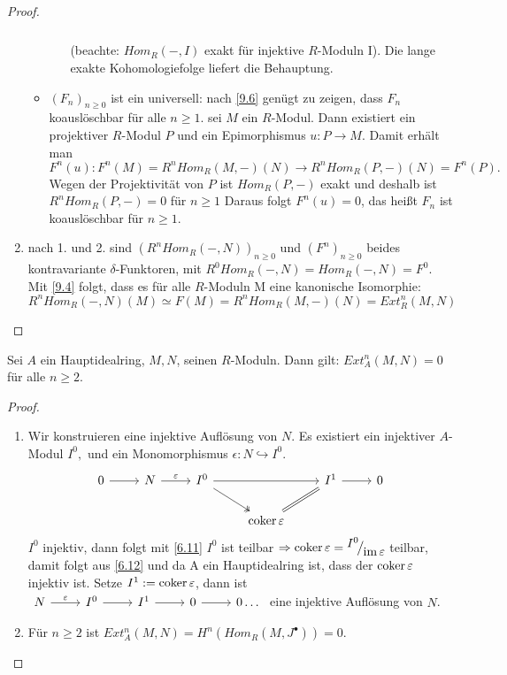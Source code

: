 \begin{proof}
\begin{enumerate}
\begin{itemize}
\begin{itemize}
$$\begin{tikzcd}
				\end{tikzcd}$$ (beachte: $Hom_R(-,I)$ exakt für injektive $R$-Moduln I). Die lange exakte Kohomologiefolge liefert die Behauptung. 
			\end{itemize}
		\item $(F_n)_{n \geq 0} $ ist ein universell: nach \ref{9.6} genügt zu zeigen, dass $F_n$ koauslöschbar für alle $n \geq 1$. sei $M$ ein $R$-Modul. Dann existiert ein projektiver $R$-Modul $P$ und ein Epimorphismus $u: P \to M $. 
		Damit erhält man $$F^{n}(u): F^{n}(M) = R^{n}Hom_R(M,-)(N) \to R^{n}Hom_R(P,-)(N) = F^{n}(P).$$ Wegen der Projektivität von $P$ ist $Hom_R(P,-) $ exakt und deshalb ist $R^{n}Hom_R(P,-)= 0 $ für $n \geq 1$ Daraus folgt $F^{n}(u) = 0$, das heißt $F_n $ ist koauslöschbar für $ n \geq 1$. 
		\end{itemize}
		\item nach 1. und 2. sind $(R^{n}Hom_R(-,N))_{n \geq 0} $ und $ (F^{n})_{n \geq 0} $ beides kontravariante $\delta$-Funktoren, mit $ R^{0}Hom_R(-,N) = Hom_R(-,N)= F^{0}. 
		$ Mit \ref{9.4} folgt, dass es für alle $R$-Moduln M eine kanonische Isomorphie: 
		$$R^{n}Hom_R(-,N)(M) \simeq F(M) = R^{n}Hom_R(M,-)(N) = Ext^{n}_R(M,N)$$
	\end{enumerate}
\end{proof}
\begin{sa}\label{10.3}
	Sei $A$ ein Hauptidealring, $M,N$, seinen $R$-Moduln. Dann gilt: $Ext^{n}_A(M,N) =0 $
	 für alle $ n \geq 2$.
\end{sa}
\begin{proof}
	\begin{enumerate}
		\item Wir konstruieren eine injektive Auflösung von $N$. Es existiert ein injektiver $A$-Modul $I^{0}, $ und ein Monomorphismus $\epsilon: N \hookrightarrow I^{0}.$ 
		$$\begin{tikzcd}
		0\arrow{r} & N \arrow{r}{\epsilon} & I^{0}\arrow[two heads]{dr} \arrow{rr}& & I^1 \arrow{r} & 0 \\
		& & & \coker \epsilon \arrow[equal]{ur}& & 
		\end{tikzcd}$$
		$I^{0} $ injektiv, dann folgt mit \ref{6.11} $I^{0} $ ist teilbar $\Ra \coker \epsilon = \QR{I^0}{\im \epsilon } $ teilbar, damit folgt aus \ref{6.12} und da A ein Hauptidealring ist, dass der $\operatorname{coker} \varepsilon $ injektiv ist.  Setze $I^1 := \operatorname{coker} \varepsilon$, dann ist $\begin{tikzcd}
		N \arrow{r}{\epsilon} & I^{0} \arrow{r} & I^1 \arrow{r} & 0 \arrow{r}  & 0 \dots
		\end{tikzcd}$ eine injektive Auflösung von $N$. 
		\item Für $n \geq 2 $ ist $ Ext^{n}_A(M,N) = H^{n}(Hom_R(M,J^{\bullet})) = 0.$
		
	\end{enumerate}
\end{proof}
